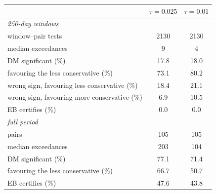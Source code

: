 \begin{tabular}{lcc}
\toprule
 & $\tau=0.025$ & $\tau=0.01$\\
\midrule
\multicolumn{3}{l}{\emph{250-day windows}}\\
window--pair tests & 2130 & 2130\\
median exceedances & 9 & 4\\
DM significant (\%) & 17.8 & 18.0\\
\quad favouring the less conservative (\%) & 73.1 & 80.2\\
\quad wrong sign, favouring less conservative (\%) & 18.4 & 21.1\\
\quad wrong sign, favouring more conservative (\%) & 6.9 & 10.5\\
EB certifies (\%) & 0.0 & 0.0\\
\midrule
\multicolumn{3}{l}{\emph{full period}}\\
pairs & 105 & 105\\
median exceedances & 203 & 104\\
DM significant (\%) & 77.1 & 71.4\\
\quad favouring the less conservative (\%) & 66.7 & 50.7\\
EB certifies (\%) & 47.6 & 43.8\\
\bottomrule
\end{tabular}
